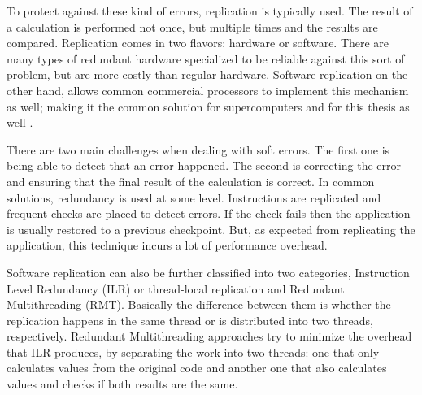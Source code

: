 To protect against these kind of errors, replication is typically used. The result of a calculation is performed not once, but multiple times and the results are compared. Replication comes in two flavors: hardware or software. There are many types of redundant hardware specialized to be reliable against this sort of problem, but are more costly than regular hardware. Software replication on the other hand, allows common commercial processors to implement this mechanism as well; making it the common solution for supercomputers and for this thesis as well \cite{zhang2012daft}. 

There are two main challenges when dealing with soft errors. The first one is being able to detect that an error happened. The second is correcting the error and ensuring that the final result of the calculation is correct. In common solutions, redundancy is used at some level. Instructions are replicated and frequent checks are placed to detect errors. If the check fails then the application is usually restored to a previous checkpoint. But, as expected from replicating the application, this technique incurs a lot of performance overhead. 


Software replication can also be further classified into two categories, Instruction Level Redundancy (ILR) or thread-local replication and Redundant Multithreading (RMT). Basically the difference between them is whether the replication happens in the same thread or is distributed into two threads, respectively. Redundant Multithreading approaches \cite{mitropoulou2016comet}  \cite{wang2007compiler} \cite{zhang2012daft} try to minimize the overhead that ILR produces, by separating the work into two threads: one that only calculates values from the original code and another one that also calculates values and checks if both results are the same.

